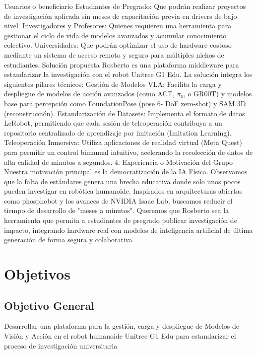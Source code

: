 \documentclass[stu,12pt,floatsintext]{apa7}
\begin{document}
Usuarios o beneficiario
Estudiantes de Pregrado: Que podrán realizar proyectos de investigación aplicada sin
meses de capacitación previa en drivers de bajo nivel.
Investigadores y Profesores: Quienes requieren una herramienta para gestionar el ciclo de
vida de modelos avanzados y acumular conocimiento colectivo.
Universidades: Que podrán optimizar el uso de hardware costoso mediante un sistema de
acceso remoto y seguro para múltiples nichos de estudiantes.
Solución propuesta
Rosberto es una plataforma middleware para estandarizar la investigación con el robot Unitree G1
Edu. La solución integra los siguientes pilares técnicos:
Gestión de Modelos VLA: Facilita la carga y despliegue de modelos de acción avanzados
(como ACT, $\pi_0$, o GR00T) y modelos base para percepción como FoundationPose (pose 6- DoF zero-shot) y SAM 3D (reconstrucción).
Estandarización de Datasets: Implementa el formato de datos LeRobot, permitiendo que
cada sesión de teleoperación contribuya a un repositorio centralizado de aprendizaje por
imitación (Imitation Learning).
Teleoperación Inmersiva: Utiliza aplicaciones de realidad virtual (Meta Quest) para
permitir un control bimanual intuitivo, acelerando la recolección de datos de alta calidad de
minutos a segundos.
4. Experiencia o Motivación del Grupo
Nuestra motivación principal es la democratización de la IA Física. Observamos que la falta de
estándares genera una brecha educativa donde solo unos pocos pueden investigar en robótica
humanoide. Inspirados en arquitecturas abiertas como phosphobot y los avances de NVIDIA
Isaac Lab, buscamos reducir el tiempo de desarrollo de "meses a minutos". Queremos que
Rosberto sea la herramienta que permita a estudiantes de pregrado publicar investigación de
impacto, integrando hardware real con modelos de inteligencia artificial de última generación de
forma segura y colaborativa


\clearpage


\section{Objetivos}



\subsection{Objetivo General}

Desarrollar una plataforma para la gestión, carga y despliegue de Modelos de Visión y Acción en
el robot humanoide Unitree G1 Edu para estandarizar el proceso de investigación universitaria
\end{document}
